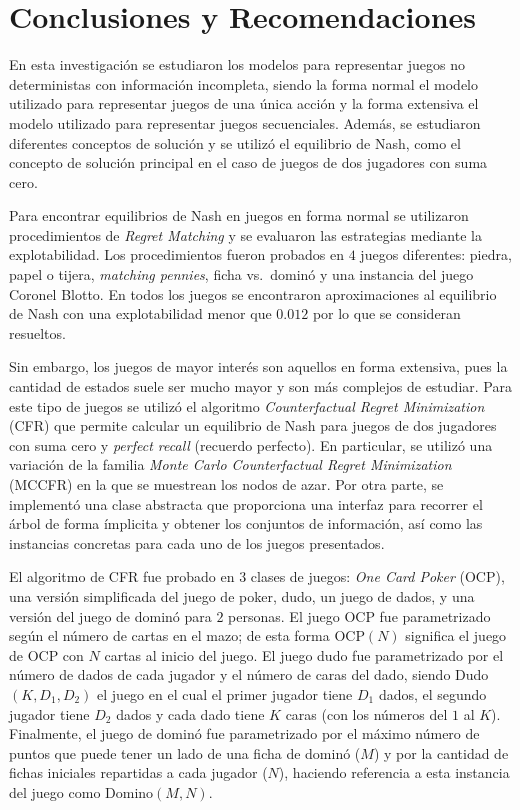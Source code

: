 \chapter*{Conclusiones y Recomendaciones}

En esta investigación se estudiaron los modelos para representar juegos no deterministas con información incompleta, siendo la forma normal el modelo utilizado para representar juegos de una única acción y la forma extensiva el modelo utilizado para representar juegos secuenciales. Además, se estudiaron diferentes conceptos de solución y se utilizó el equilibrio de Nash, como el concepto de solución principal en el caso de juegos de dos jugadores con suma cero.

Para encontrar equilibrios de Nash en juegos en forma normal se utilizaron procedimientos de \textit{Regret Matching} y se evaluaron las estrategias mediante la explotabilidad. Los procedimientos fueron probados en $4$ juegos diferentes: piedra, papel o tijera, \textit{matching pennies}, ficha vs.\ dominó y una instancia del juego Coronel Blotto. En todos los juegos se encontraron aproximaciones al equilibrio de Nash con una explotabilidad menor que $0.012$ por lo que se consideran resueltos.

Sin embargo, los juegos de mayor interés son aquellos en forma extensiva, pues la cantidad de estados suele ser mucho mayor y son más complejos de estudiar. Para este tipo de juegos se utilizó el algoritmo \textit{Counterfactual Regret Minimization} (CFR) que permite calcular un equilibrio de Nash para juegos de dos jugadores con suma cero y \textit{perfect recall} (recuerdo perfecto). En particular, se utilizó una variación de la familia \textit{Monte Carlo Counterfactual Regret Minimization} (MCCFR) en la que se muestrean los nodos de azar. Por otra parte, se implementó una clase abstracta que proporciona una interfaz para recorrer el árbol de forma ímplicita y obtener los conjuntos de información, así como las instancias concretas para cada uno de los juegos presentados.

El algoritmo de CFR fue probado en $3$ clases de juegos: \textit{One Card Poker} (OCP), una versión simplificada del juego de poker, dudo, un juego de dados, y una versión del juego de dominó para $2$ personas. El juego OCP fue parametrizado según el número de cartas en el mazo; de esta forma OCP$(N)$ significa el juego de OCP con $N$ cartas al inicio del juego. El juego dudo fue parametrizado por el número de dados de cada jugador y el número de caras del dado, siendo Dudo$(K, D_1, D_2)$ el juego en el cual el primer jugador tiene $D_1$ dados, el segundo jugador tiene $D_2$ dados y cada dado tiene $K$ caras (con los números del $1$ al $K$). Finalmente, el juego de dominó fue parametrizado por el máximo número de puntos que puede tener un lado de una ficha de dominó ($M$) y por la cantidad de fichas iniciales repartidas a cada jugador ($N$), haciendo referencia a esta instancia del juego como Domino$(M, N)$.


